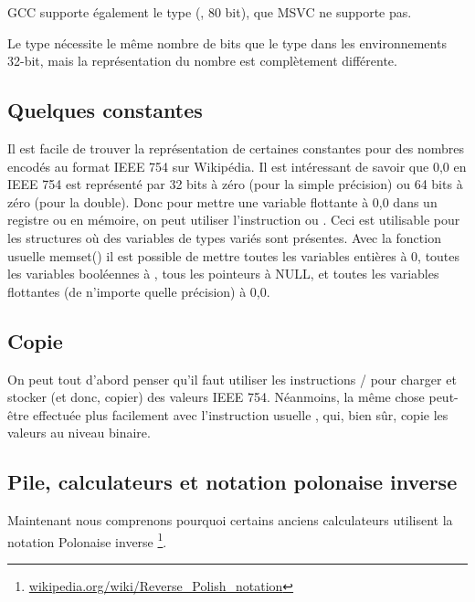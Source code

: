 GCC supporte également le type  (\FNURLEP,
80 bit), que MSVC ne supporte pas.

Le type \Tfloat nécessite le même nombre de bits que le type \Tint dans les environnements
32-bit, mais la représentation du nombre est complètement différente.





\subsection{Quelques constantes}

Il est facile de trouver la représentation de certaines constantes pour des nombres
encodés au format IEEE 754 sur Wikipédia.
Il est intéressant de savoir que 0,0 en IEEE 754 est représenté par 32 bits à zéro
(pour la simple précision) ou 64 bits à zéro (pour la double).
Donc pour mettre une variable flottante à 0,0 dans un registre ou en mémoire, on
peut utiliser l'instruction \MOV ou .
Ceci est utilisable pour les structures où des variables de types variés sont présentes.
Avec la fonction usuelle memset() il est possible de mettre toutes les variables
entières à 0, toutes les variables booléennes à , tous les pointeurs à
NULL, et toutes les variables flottantes (de n'importe quelle précision) à 0,0.

\subsection{Copie}

On peut tout d'abord penser qu'il faut utiliser les instructions /
pour charger et stocker (et donc, copier) des valeurs IEEE 754.
Néanmoins, la même chose peut-être effectuée plus facilement avec l'instruction usuelle
, qui, bien sûr, copie les valeurs au niveau binaire.

\subsection{Pile, calculateurs et notation polonaise inverse}


Maintenant nous comprenons pourquoi certains anciens calculateurs utilisent la notation
Polonaise inverse
\footnote{\href{http://go.yurichev.com/17354}{wikipedia.org/wiki/Reverse\_Polish\_notation}}.

